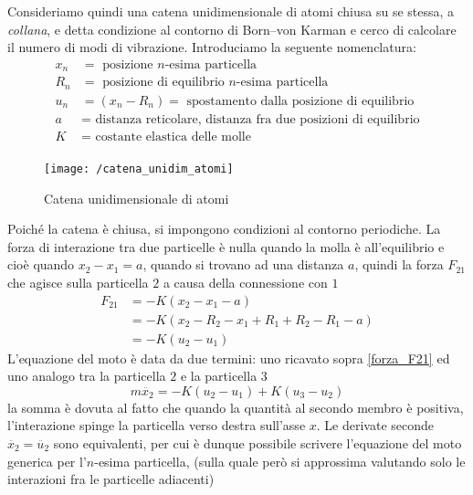 Consideriamo quindi una catena unidimensionale di atomi chiusa su se stessa, a \textit{collana}, e detta condizione al contorno di Born–von Karman e cerco di calcolare il numero di modi di vibrazione.
Introduciamo la seguente nomenclatura:
\begin{equation}
\begin{split}
x_n & = \mbox{ posizione $n$-esima particella} \\
R_n & = \mbox{ posizione di equilibrio $n$-esima particella} \\
u_n & = (x_n - R_n) = \mbox{ spostamento dalla posizione di equilibrio } \\
a & = \mbox{ distanza reticolare, distanza fra due posizioni di equilibrio} \\
K & = \mbox{ costante elastica delle molle} \\
\end{split}
\end{equation}
\begin{figure}[h]
\centering
\texttt{[image: /catena\_unidim\_atomi]}
\caption{Catena unidimensionale di atomi}
\end{figure}
Poiché la catena è chiusa, si impongono condizioni al contorno periodiche.
La forza di interazione tra due particelle è nulla quando la molla è all'equilibrio e cioè quando $x_2-x_1 = a$, quando si trovano ad una distanza $a$, quindi la forza $F_{21}$ che agisce sulla particella $2$ a causa della connessione con $1$
\begin{equation}
\begin{split}
F_{21} & = - K (x_2 - x_1 - a) \\
& = - K (x_2 - R_2 - x_1 + R_1 + R_2 - R_1 - a) \\
& = - K (u_2 - u_1)
\end{split}
\label{forza_F21}
\end{equation}
L'equazione del moto è data da due termini: uno ricavato sopra \ref{forza_F21} ed uno analogo tra la particella $2$ e la particella $3$
\begin{equation}
m \ddot{x_2} = - K (u_2 - u_1) + K (u_3 - u_2)
\end{equation}
la somma è dovuta al fatto che quando la quantità al secondo membro è positiva, l'interazione spinge la particella verso destra sull'asse $x$.
Le derivate seconde $\ddot{x_2} = \ddot{u_2}$ sono equivalenti, per cui è dunque possibile scrivere l'equazione del moto generica per l'$n$-esima particella, 
(sulla quale però si approssima valutando solo le interazioni fra le particelle adiacenti)
